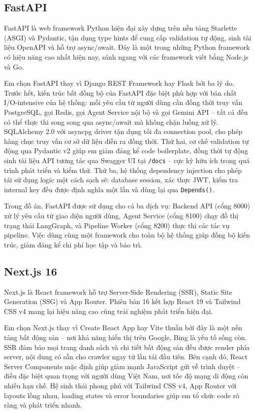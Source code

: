 \subsection{FastAPI}

FastAPI là web framework Python hiện đại xây dựng trên nền tảng Starlette (ASGI) và Pydantic, tận dụng type hints để cung cấp validation tự động, sinh tài liệu OpenAPI và hỗ trợ async/await. Đây là một trong những Python framework có hiệu năng cao nhất hiện nay, sánh ngang với các framework viết bằng Node.js và Go.

Em chọn FastAPI thay vì Django REST Framework hay Flask bởi ba lý do. Trước hết, kiến trúc bất đồng bộ của FastAPI đặc biệt phù hợp với bản chất I/O-intensive của hệ thống: mỗi yêu cầu từ người dùng cần đồng thời truy vấn PostgreSQL, gọi Redis, gọi Agent Service nội bộ và gọi Gemini API -- tất cả đều có thể thực thi song song qua async/await mà không chặn luồng xử lý. SQLAlchemy 2.0 với asyncpg driver tận dụng tối đa connection pool, cho phép hàng chục truy vấn cơ sở dữ liệu diễn ra đồng thời. Thứ hai, cơ chế validation tự động qua Pydantic v2 giúp em giảm đáng kể code boilerplate, đồng thời tự động sinh tài liệu API tương tác qua Swagger UI tại \texttt{/docs} -- cực kỳ hữu ích trong quá trình phát triển và kiểm thử. Thứ ba, hệ thống dependency injection cho phép tái sử dụng logic một cách sạch sẽ: database session, xác thực JWT, kiểm tra internal key đều được định nghĩa một lần và dùng lại qua \texttt{Depends()}.

Trong đồ án, FastAPI được sử dụng cho cả ba dịch vụ: Backend API (cổng 8000) xử lý yêu cầu từ giao diện người dùng, Agent Service (cổng 8100) chạy đồ thị trạng thái LangGraph, và Pipeline Worker (cổng 8200) thực thi các tác vụ pipeline. Việc dùng cùng một framework cho toàn bộ hệ thống giúp đồng bộ kiến trúc, giảm đáng kể chi phí học tập và bảo trì.

\subsection{Next.js 16}

Next.js là React framework hỗ trợ Server-Side Rendering (SSR), Static Site Generation (SSG) và App Router. Phiên bản 16 kết hợp React 19 và Tailwind CSS v4 mang lại hiệu năng cao cùng trải nghiệm phát triển hiện đại.

Em chọn Next.js thay vì Create React App hay Vite thuần bởi đây là một nền tảng bất động sản -- nơi khả năng hiển thị trên Google, Bing là yếu tố sống còn. SSR đảm bảo mọi trang danh sách và chi tiết bất động sản đều được render phía server, nội dung có sẵn cho crawler ngay từ lần tải đầu tiên. Bên cạnh đó, React Server Components mặc định giúp giảm mạnh JavaScript gửi về trình duyệt -- điều đặc biệt quan trọng với người dùng Việt Nam, nơi tốc độ mạng di động còn nhiều hạn chế. Hệ sinh thái phong phú với Tailwind CSS v4, App Router với layouts lồng nhau, loading states và error boundaries giúp em tổ chức code rõ ràng và phát triển nhanh.

